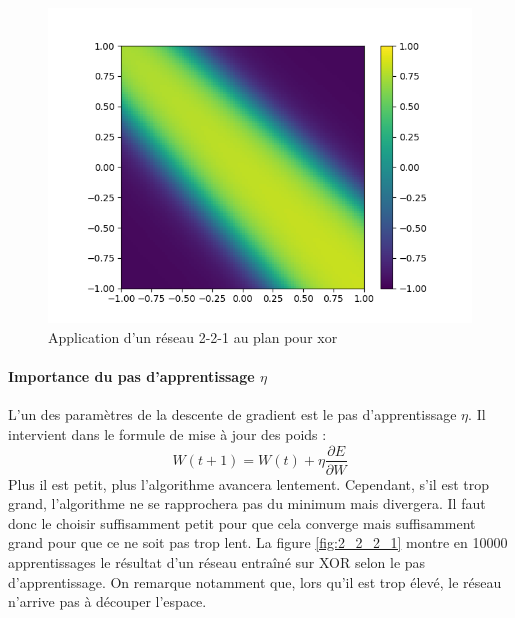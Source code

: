 \begin{figure}[h!]
  \includegraphics[width=\linewidth]{fig/xor221_eta009.png}
  \caption{Application d'un réseau 2-2-1 au plan pour xor}
  \label{fig:2_2_1}
\end{figure}



\paragraph{Importance du pas d'apprentissage $\eta$}

L'un des paramètres de la descente de gradient est le pas d'apprentissage $\eta$. Il intervient dans le formule de mise à jour des poids :
\[
W(t+1) = W(t) + \eta \frac{\partial E}{\partial W} 
\]
Plus il est petit, plus l'algorithme avancera lentement. Cependant, s'il est trop grand, l'algorithme ne se rapprochera pas du minimum mais divergera. Il faut donc le choisir suffisamment petit pour que cela converge mais suffisamment grand pour que ce ne soit pas trop lent. La figure \ref{fig:2_2_2_1} montre en 10000 apprentissages le résultat d'un réseau entraîné sur XOR selon le pas d'apprentissage. On remarque notamment que, lors qu'il est trop élevé, le réseau n'arrive pas à découper l'espace.

